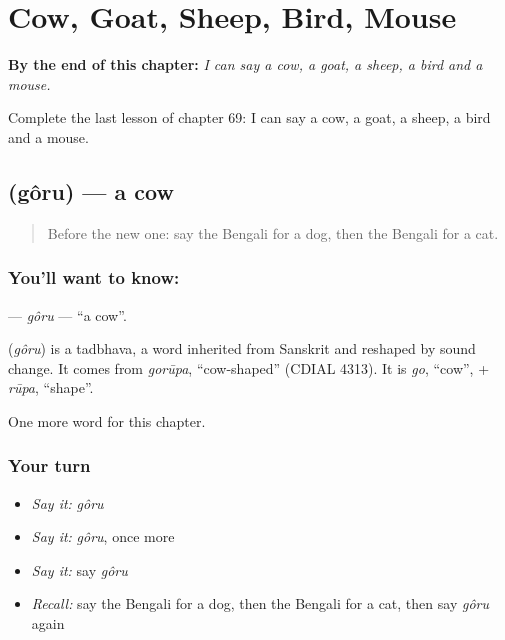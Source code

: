 
\chapter{Cow, Goat, Sheep, Bird, Mouse}
\label{ch:bn-cow-goat-sheep-bird-mouse}

\begin{chapteropening}
\textbf{By the end of this chapter:} \emph{I can say a cow, a goat, a sheep, a bird and a mouse.}

Complete the last lesson of chapter 69: I can say a cow, a goat, a sheep, a bird and a mouse.
\end{chapteropening}

\section[\texorpdfstring{\bn{গরু} (gôru)}{গরু (gôru)}]{ (gôru) — a cow}

\label{lesson:BN-C69-goru}



\begin{quote}
Before the new one: say the Bengali for a dog, then the Bengali for a cat.
\end{quote}

\subsection*{You'll want to know: }
\textbf{} — \emph{gôru} — \textquotedblleft{}a cow\textquotedblright{}.

\begin{cousinweb}
\textbf{} (\emph{gôru}) is a tadbhava, a word inherited from Sanskrit and reshaped by sound change. It comes from \emph{gorūpa}, \textquotedblleft{}cow-shaped\textquotedblright{} (CDIAL 4313). It is \emph{go}, \textquotedblleft{}cow\textquotedblright{}, + \emph{rūpa}, \textquotedblleft{}shape\textquotedblright{}.
\end{cousinweb}

\begin{grammarlens}[title={What you've built}]
One more word for this chapter.
\end{grammarlens}

\subsection*{Your turn}
\begin{itemize}
\raggedright
  \item \emph{Say it:} \emph{gôru}
  \item \emph{Say it:} \emph{gôru}, once more
  \item \emph{Say it:} say \emph{gôru}
  \item \emph{Recall:} say the Bengali for a dog, then the Bengali for a cat, then say \emph{gôru} again
\end{itemize}

